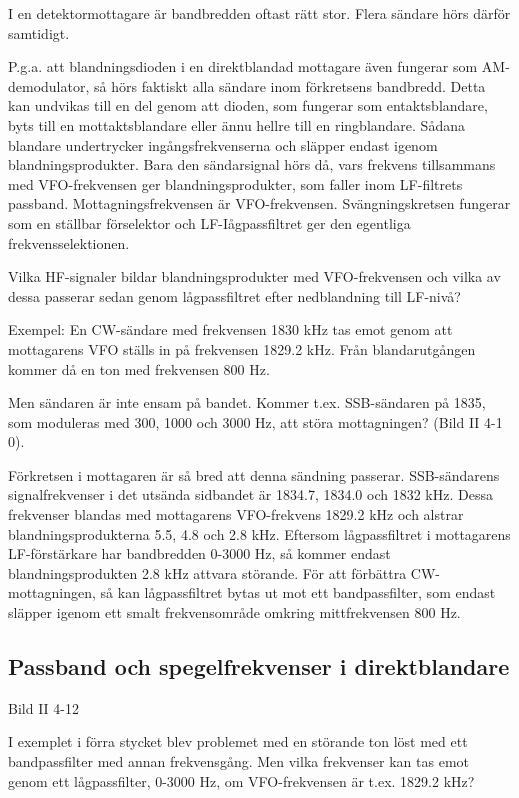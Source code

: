 I en detektormottagare är bandbredden oftast rätt stor. Flera sändare
hörs därför samtidigt.

P.g.a. att blandningsdioden i en direktblandad mottagare även fungerar
som AM-demodulator, så hörs faktiskt alla sändare inom förkretsens
bandbredd. Detta kan undvikas till en del genom att dioden, som
fungerar som entaktsblandare, byts till en mottaktsblandare eller ännu
hellre till en ringblandare. Sådana blandare undertrycker
ingångsfrekvenserna och släpper endast igenom
blandningsprodukter. Bara den sändarsignal hörs då, vars frekvens
tillsammans med VFO-frekvensen ger blandningsprodukter, som faller
inom LF-filtrets passband. Mottagningsfrekvensen är
VFO-frekvensen. Svängningskretsen fungerar som en ställbar förselektor
och LF-Iågpassfiltret ger den egentliga frekvensselektionen.

Vilka HF-signaler bildar blandningsprodukter med VFO-frekvensen och
vilka av dessa passerar sedan genom lågpassfiltret efter nedblandning
till LF-nivå?

Exempel: En CW-sändare med frekvensen 1830 kHz tas emot genom att
mottagarens VFO ställs in på frekvensen 1829.2 kHz. Från
blandarutgången kommer då en ton med frekvensen 800 Hz.

Men sändaren är inte ensam på bandet.  Kommer t.ex. SSB-sändaren på
1835, som moduleras med 300, 1000 och 3000 Hz, att störa mottagningen?
(Bild II 4-1 0).

Förkretsen i mottagaren är så bred att denna sändning
passerar. SSB-sändarens signalfrekvenser i det utsända sidbandet är
1834.7, 1834.0 och 1832 kHz. Dessa frekvenser blandas med mottagarens
VFO-frekvens 1829.2 kHz och alstrar blandningsprodukterna 5.5, 4.8 och
2.8 kHz. Eftersom lågpassfiltret i mottagarens LF-förstärkare har
bandbredden 0-3000 Hz, så kommer endast blandningsprodukten 2.8 kHz
attvara störande. För att förbättra CW-mottagningen, så kan
lågpassfiltret bytas ut mot ett bandpassfilter, som endast släpper
igenom ett smalt frekvensområde omkring mittfrekvensen 800 Hz.

\subsection{Passband och spegelfrekvenser i direktblandare}

Bild II 4-12

I exemplet i förra stycket blev problemet med en störande ton löst med
ett bandpassfilter med annan frekvensgång.  Men vilka frekvenser kan
tas emot genom ett lågpassfilter, 0-3000 Hz, om VFO-frekvensen är
t.ex. 1829.2 kHz?


